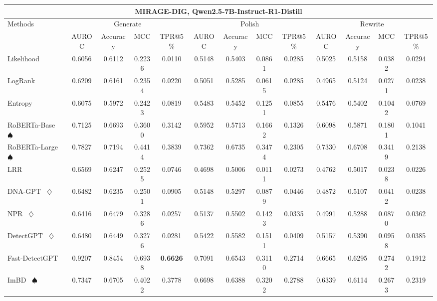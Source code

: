 \begin{table*}[h]
{\begin{tabular}{l|cccc|cccc|cccc}
    \hline

    \hline
    \multicolumn{13}{c}{\textbf{MIRAGE-DIG, Qwen2.5-7B-Instruct-R1-Distill}}\\
    \hline

    \hline

    \hline
    \multirow{2}{*}{Methods}&\multicolumn{4}{c|}{Generate}&\multicolumn{4}{c|}{Polish}&\multicolumn{4}{c}{Rewrite} \\
    &  AUROC  &  Accuracy  &  MCC  &  TPR@5\%  &  AUROC  &  Accuracy  &  MCC  &  TPR@5\%  &  AUROC  &  Accuracy  &  MCC  &  TPR@5\%  \\
    \hline

    \hline
    Likelihood~\cite{likelihood} & 0.6056 & 0.6112 & 0.2236 & 0.0110 & 0.5148 & 0.5403 & 0.0861 & 0.0285 & 0.5025 & 0.5158 & 0.0382 & 0.0294 \\
    LogRank~\cite{logrank} & 0.6209 & 0.6161 & 0.2354 & 0.0220 & 0.5051 & 0.5285 & 0.0615 & 0.0285 & 0.4965 & 0.5124 & 0.0271 & 0.0238 \\
    Entropy~\cite{entropy} & 0.6075 & 0.5972 & 0.2423 & 0.0819 & 0.5483 & 0.5452 & 0.1251 & 0.0855 & 0.5476 & 0.5402 & 0.1042 & 0.0769 \\
    RoBERTa-Base~\cite{roberta} $\spadesuit$ & 0.7125 & 0.6693 & 0.3600 & 0.3142 & 0.5952 & 0.5713 & 0.1662 & 0.1326 & 0.6098 & 0.5871 & 0.1801 & 0.1041 \\
    RoBERTa-Large~\cite{roberta} $\spadesuit$ & 0.7827 & 0.7194 & 0.4414 & 0.3839 & 0.7362 & 0.6735 & 0.3474 & 0.2305 & 0.7330 & 0.6708 & 0.3419 & 0.2138 \\
    LRR~\cite{lrrandnpr} & 0.6569 & 0.6247 & 0.2525 & 0.0746 & 0.4698 & 0.5006 & 0.0111 & 0.0273 & 0.4762 & 0.5017 & 0.0238 & 0.0226 \\
    DNA-GPT~\cite{dna-gpt} $\diamondsuit$ & 0.6482 & 0.6235 & 0.2501 & 0.0905 & 0.5148 & 0.5297 & 0.0879 & 0.0446 & 0.4872 & 0.5107 & 0.0412 & 0.0238 \\
    NPR~\cite{lrrandnpr} $\diamondsuit$ & 0.6416 & 0.6479 & 0.3286 & 0.0257 & 0.5137 & 0.5502 & 0.1423 & 0.0335 & 0.4991 & 0.5288 & 0.0870 & 0.0362 \\
    DetectGPT~\cite{detectgpt} $\diamondsuit$ & 0.6480 & 0.6449 & 0.3276 & 0.0281 & 0.5422 & 0.5582 & 0.1511 & 0.0409 & 0.5157 & 0.5390 & 0.0958 & 0.0385 \\
    Fast-DetectGPT~\cite{fastdetectgpt} & 0.9207 & 0.8454 & 0.6938 & \textbf{0.6626} & 0.7091 & 0.6543 & 0.3110 & 0.2714 & 0.6665 & 0.6295 & 0.2742 & 0.1912 \\
    ImBD~\cite{imbd} $\spadesuit$ & 0.7347 & 0.6705 & 0.4022 & 0.3778 & 0.6698 & 0.6388 & 0.3202 & 0.2788 & 0.6339 & 0.6114 & 0.2673 & 0.2319 \\
    \hline
    

\end{tabular}}
\end{table*}
